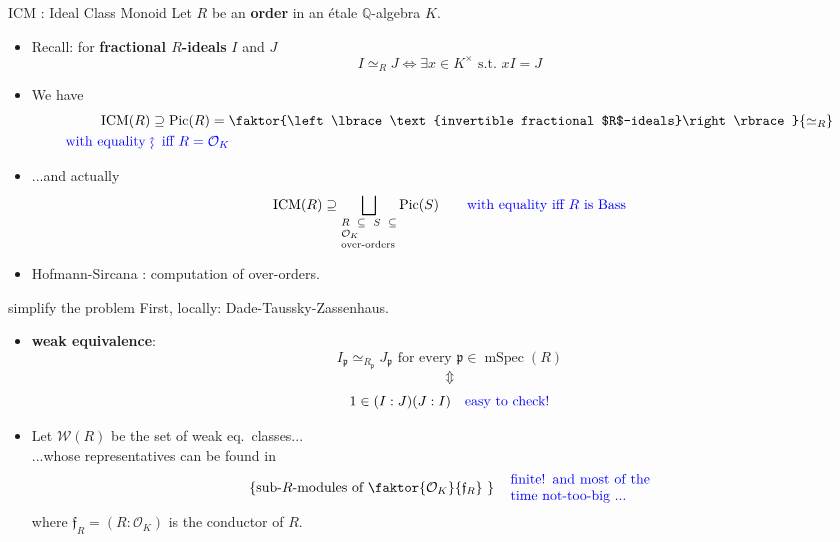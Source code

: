 \documentclass[usenames,dvipsnames]{beamer}
\def\Q{\mathbb{Q}}
\DeclareMathOperator{\ICM}{ICM}
\DeclareMathOperator{\Pic}{Pic}
\DeclareMathOperator{\mSpec}{mSpec}
\newcommand{\cO}{{\mathcal O}}
\newcommand{\cW}{{\mathcal W}}
\newcommand{\p}{{\mathfrak p}}
\newcommand{\frf}{{\mathfrak f}}
\newcommand{\set}[1]{\left\lbrace#1\right\rbrace }
\newcommand{\blue}[1]{\textcolor{blue}{#1}}
\begin{document}
\begin{frame}{ICM : Ideal Class Monoid}
	Let $R$ be an {\bf order} in an \'etale  $\Q$-algebra $K$.
	\begin{itemize}
\pause
	\item Recall: for {\bf fractional $R$-ideals} $I$ and $J$
		\[ I\simeq_R J \Longleftrightarrow \exists x \in K^\times \text{ s.t.~} xI=J \]
\pause
	\item We have
		\begin{align*}
	\ICM(R) & \supseteq \Pic(R)=\faktor{\set{\text{invertible fractional $R$-ideals}}}{\simeq_R} \\
	\blue{\text{with equality }} & \blue{\rotatebox[origin=c]{90}{$\large\rightsquigarrow$}\mkern2mu \text{ iff } R=\cO_K }
	\end{align*}
\pause 
	\item ...and actually
	\[ \ICM(R) \supseteq \bigsqcup_{\scriptsize\parbox{5 em}{$R\subseteq S \subseteq \cO_K$\\over-orders}}\Pic(S) \qquad   
		\textcolor{blue}{\text{with equality iff $R$ is Bass}} \]
\pause
	\item Hofmann-Sircana : computation of over-orders.
\end{itemize}
\end{frame}

\begin{frame}{ simplify the problem  }
	First, locally: Dade-Taussky-Zassenhaus.
	\begin{itemize}
\pause 
	\item  \textbf{weak equivalence}:
	\[I_{\p}\simeq_{R_{\p}} J_{\p} \text{ for every } {\p} \in \mSpec(R)\]
\pause
	\vspace{-6mm}\[\Updownarrow\]
	\[1\in (I:J)(J:I)\quad \textcolor{blue}{\text{easy to check!}}\]
\pause
	\item Let $\cW(R)$ be the set of weak eq.~classes...\\
\pause
	...whose representatives can be found in
	\[\set{\text{sub-$R$-modules of $\faktor{\cO_K}{\frf_R}$ }} \quad \textcolor{blue}{\parbox{10 em}{finite! and most of the time not-too-big ...}}\]
	where $\frf_R=(R:\cO_K)$ is the conductor of $R$.
	\end{itemize}
\end{frame}
\end{document}

